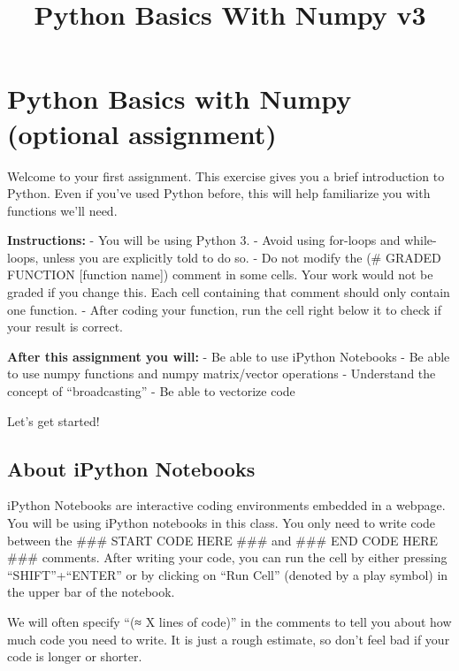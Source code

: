 \documentclass[11pt]{article}
\title{Python Basics With Numpy v3}
\begin{document}
    
    
    \maketitle
    
    

    
    \section{Python Basics with Numpy (optional
assignment)}\label{python-basics-with-numpy-optional-assignment}

Welcome to your first assignment. This exercise gives you a brief
introduction to Python. Even if you've used Python before, this will
help familiarize you with functions we'll need.

\textbf{Instructions:} - You will be using Python 3. - Avoid using
for-loops and while-loops, unless you are explicitly told to do so. - Do
not modify the (\# GRADED FUNCTION {[}function name{]}) comment in some
cells. Your work would not be graded if you change this. Each cell
containing that comment should only contain one function. - After coding
your function, run the cell right below it to check if your result is
correct.

\textbf{After this assignment you will:} - Be able to use iPython
Notebooks - Be able to use numpy functions and numpy matrix/vector
operations - Understand the concept of ``broadcasting'' - Be able to
vectorize code

Let's get started!

    \subsection{About iPython Notebooks}\label{about-ipython-notebooks}

iPython Notebooks are interactive coding environments embedded in a
webpage. You will be using iPython notebooks in this class. You only
need to write code between the \#\#\# START CODE HERE \#\#\# and \#\#\#
END CODE HERE \#\#\# comments. After writing your code, you can run the
cell by either pressing ``SHIFT''+``ENTER'' or by clicking on ``Run
Cell'' (denoted by a play symbol) in the upper bar of the notebook.

We will often specify ``(≈ X lines of code)'' in the comments to tell
you about how much code you need to write. It is just a rough estimate,
so don't feel bad if your code is longer or shorter.
\end{document}
